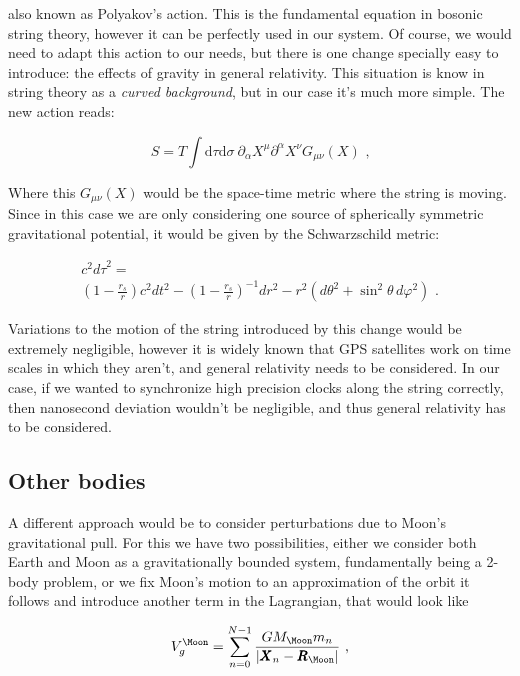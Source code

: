 \documentclass[8 pt, twocolumn]{article}
\newcommand{\dif}{\text{d}}
\renewcommand{\vec}[1]{\pmb{#1}}
\begin{document}
also known as Polyakov's action. This is the fundamental equation in bosonic string theory, however it can be perfectly used in our system. Of course, we would need to adapt this action to our needs, but there is one change specially easy to introduce: the effects of gravity in general relativity. This situation is know in string theory as a \emph{curved background}, but in our case it's much more simple. The new action reads:

\begin{equation}
  S = T \int \dif \tau \dif \sigma ~ \partial_\alpha X^\mu \partial^\alpha X^\nu G_{\mu\nu}(X) \text{ ,}
\end{equation}

Where this $G_{\mu\nu}(X)$ would be the space-time metric where the string is moving. Since in this case we are only considering one source of spherically symmetric gravitational potential, it would be given by the Schwarzschild metric:

\begin{multline}
  c^2 {d \tau}^{2} = \\\left(1 - \frac{r_s}{r} \right) c^2 dt^2 - \left(1-\frac{r_s}{r}\right)^{-1} dr^2 - r^2 \left(d\theta^2 + \sin^2\theta \, d\varphi^2\right) \text{ .}
\end{multline}

Variations to the motion of the string introduced by this change would be extremely negligible, however it is widely known that GPS satellites work on time scales in which they aren't, and general relativity needs to be considered. In our case, if we wanted to synchronize high precision clocks along the string correctly, then nanosecond deviation wouldn't be negligible, and thus general relativity has to be considered.

\subsection{Other bodies}

A different approach would be to consider perturbations due to Moon's gravitational pull. For this we have two possibilities, either we consider both Earth and Moon as a gravitationally bounded system, fundamentally being a 2-body problem, or we fix Moon's motion to an approximation of the orbit it follows and introduce another term in the Lagrangian, that would look like

\begin{equation}
  V^\Moon_g = \sum_{n=0}^{N-1} \frac{G M_\Moon m_n}{|\vec{X}_n-\vec{R}_\Moon|} \text{ ,}
\end{equation}
\end{document}
